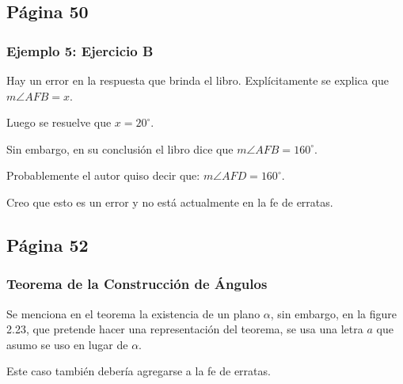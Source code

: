 \subsection{Página 50}
\subsubsection{Ejemplo 5: Ejercicio B}

Hay un error en la respuesta que brinda el libro. Explícitamente se explica que \(m\angle{AFB} = x\).

Luego se resuelve que \(x=20^{\circ}\).

Sin embargo, en su conclusión el libro dice que \(m\angle{AFB} = 160^{\circ}\).

Probablemente el autor quiso decir que: \(m\angle{AFD} = 160^{\circ}\).

Creo que esto es un error y no está actualmente en la fe de erratas.

\subsection{Página 52}
\subsubsection{Teorema de la Construcción de Ángulos}

Se menciona en el teorema la existencia de un plano \(\alpha\), sin embargo, en la figure 2.23, que pretende hacer una representación del teorema, se usa una letra \(a\) que asumo se uso en lugar de \(\alpha\).

Este caso también debería agregarse a la fe de erratas.





